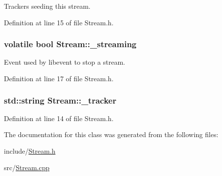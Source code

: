 Trackers seeding this stream. 



Definition at line 15 of file Stream.h.

\hypertarget{classStream_ac10bae4ebf1a1def9f8d8befa71a0bac}{
\subsubsection[{\_\-streaming}]{\setlength{\rightskip}{0pt plus 5cm}volatile bool {\bf Stream::\_\-streaming}}}
\label{classStream_ac10bae4ebf1a1def9f8d8befa71a0bac}


Event used by libevent to stop a stream. 



Definition at line 17 of file Stream.h.

\hypertarget{classStream_a2ec1ba083e298533762f00893bf23dee}{
\subsubsection[{\_\-tracker}]{\setlength{\rightskip}{0pt plus 5cm}std::string {\bf Stream::\_\-tracker}}}
\label{classStream_a2ec1ba083e298533762f00893bf23dee}


Definition at line 14 of file Stream.h.



The documentation for this class was generated from the following files:\begin{DoxyCompactItemize}
\item 
include/\hyperlink{Stream_8h}{Stream.h}\item 
src/\hyperlink{Stream_8cpp}{Stream.cpp}\end{DoxyCompactItemize}
